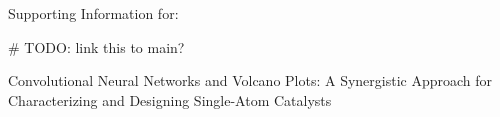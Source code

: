 Supporting Information for:

# TODO: link this to main?

Convolutional Neural Networks and Volcano Plots: A Synergistic Approach for Characterizing and Designing Single-Atom Catalysts
